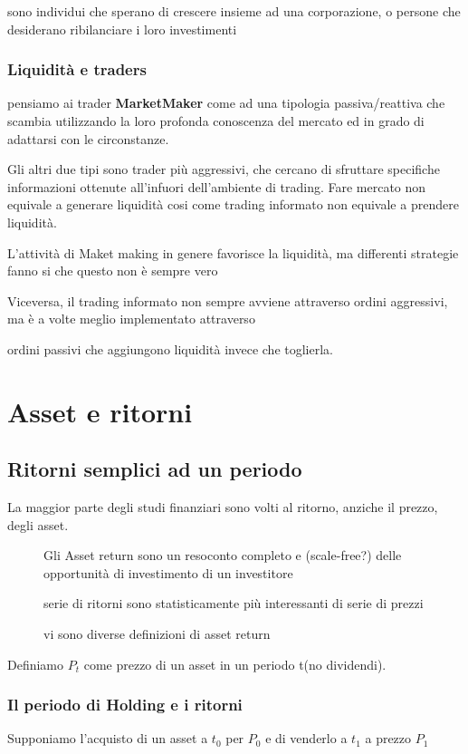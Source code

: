 \documentclass[a4paper,11pt]{report}
\begin{document}
{	sono individui che sperano di crescere insieme ad una corporazione, o persone che desiderano ribilanciare i loro investimenti

\subsection{Liquidità e traders}
	pensiamo ai trader \textbf{MarketMaker} come ad una tipologia passiva/reattiva che scambia utilizzando la loro profonda 			conoscenza del mercato ed in grado di adattarsi con le circonstanze. 
	
	Gli altri due tipi sono trader più aggressivi, che cercano di sfruttare specifiche informazioni ottenute all'infuori dell'ambiente di 		trading. \newline
	Fare mercato non equivale a generare liquidità cosi come trading informato non equivale a prendere liquidità.

	L'attività di Maket making in genere favorisce la liquidità, ma differenti strategie fanno si che questo non è sempre vero

	Viceversa, il trading informato non sempre avviene attraverso ordini aggressivi, ma è a volte meglio implementato attraverso

	ordini passivi che aggiungono liquidità invece che toglierla.

\chapter{Asset e ritorni}
	\section{Ritorni semplici ad un periodo}
	La maggior parte degli studi finanziari sono volti al ritorno, anziche il prezzo, degli asset.
\begin{description}
	\item[] Gli Asset return sono un resoconto completo e (scale-free?) delle opportunità di investimento di un investitore
	\item[] serie di ritorni sono statisticamente più interessanti di serie di prezzi
	\item[] vi sono diverse definizioni di asset return
\end{description}
Definiamo $P_t$ come prezzo di un asset in un periodo t(no dividendi). \newline
\subsection{Il periodo di Holding e i ritorni}
	Supponiamo l'acquisto di un asset a $t_0$ per $P_0$ e di venderlo a $t_1$ a prezzo $P_1$

}
\end{document}
